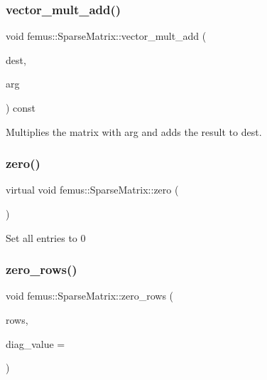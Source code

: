 \subsubsection{\texorpdfstring{vector\+\_\+mult\+\_\+add()}{vector\_mult\_add()}}
{\footnotesize\ttfamily void femus\+::\+Sparse\+Matrix\+::vector\+\_\+mult\+\_\+add (\begin{DoxyParamCaption}\item[{\mbox{\hyperlink{classfemus_1_1_numeric_vector}{Numeric\+Vector}} \&}]{dest,  }\item[{const \mbox{\hyperlink{classfemus_1_1_numeric_vector}{Numeric\+Vector}} \&}]{arg }\end{DoxyParamCaption}) const}

Multiplies the matrix with {\ttfamily arg} and adds the result to {\ttfamily dest}. \mbox{\label{classfemus_1_1_sparse_matrix_a45654dbe423d1970565b94c792ce6df3}} 
\subsubsection{\texorpdfstring{zero()}{zero()}}
{\footnotesize\ttfamily virtual void femus\+::\+Sparse\+Matrix\+::zero (\begin{DoxyParamCaption}{ }\end{DoxyParamCaption})\hspace{0.3cm}{\ttfamily [pure virtual]}}

Set all entries to 0 \mbox{\label{classfemus_1_1_sparse_matrix_acc0c5bfc18542c904dc5590b2aa60148}} 
\subsubsection{\texorpdfstring{zero\+\_\+rows()}{zero\_rows()}}
{\footnotesize\ttfamily void femus\+::\+Sparse\+Matrix\+::zero\+\_\+rows (\begin{DoxyParamCaption}\item[{std\+::vector$<$ int $>$ \&}]{rows,  }\item[{double}]{diag\+\_\+value = {} }\end{DoxyParamCaption})\hspace{0.3cm}{\ttfamily [virtual]}}



